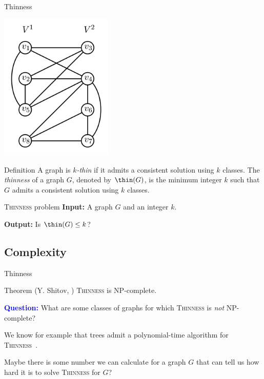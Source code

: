 \documentclass{beamer}
\begin{document}
\begin{frame}{Thinness}
    \begin{center}
        \includegraphics[width=0.4\textwidth]{img/ejemplo_thinness.png}
    \end{center}
\end{frame}

\begin{frame}{Definition}
    A graph is \emph{$k$-thin} if it admits a consistent solution using $k$ classes.
    The \emph{thinness} of a graph $G$, denoted by $\thin(G)$, is the minimum integer $k$ such that $G$ admits a consistent solution using $k$ classes.
    \vspace{1em}
    \begin{block}{\textsc{Thinness} problem}
        \textbf{Input:} A graph $G$ and an integer $k$.

        \textbf{Output:} Is $\thin(G) \leq k$?
    \end{block}
\end{frame}


\subsection{Complexity}
\begin{frame}{Thinness}
    \begin{block}{Theorem (Y. Shitov, \cite{thinness-np-complete})}
        \textsc{Thinness} is NP-complete.
    \end{block}
    \pause
    \vspace{1em}
    \textbf{\textcolor{blue}{Question:}} What are some classes of graphs for which \textsc{Thinness} is \emph{not} NP-complete? 
    \pause 
    
    We know for example that trees admit a polynomial-time algorithm for \textsc{Thinness}~\cite{thinness-of-trees}.
    \pause

    Maybe there is some number we can calculate for a graph $G$ that can tell us how hard it is to solve \textsc{Thinness} for $G$?
\end{frame}
\end{document}
